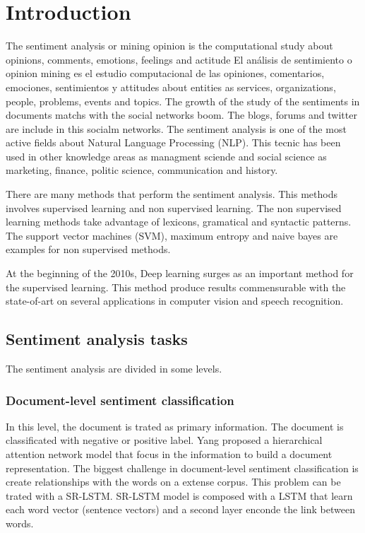 \section{Introduction}

The sentiment analysis or mining opinion is the computational study about opinions, comments, emotions, feelings and actitude
El análisis de sentimiento o opinion mining es el estudio computacional de las opiniones, comentarios, emociones, sentimientos y attitudes about entities as services, organizations, people, problems, events and topics\cite{Liu_2015}. The growth of the study of the sentiments in documents matchs with the social networks boom. The blogs, forums and twitter are include in this socialm networks. The sentiment analysis is one of the most active fields about Natural Language Processing (NLP). This tecnic has been used in other knowledge areas as managment sciende and social science as marketing, finance, politic science, communication and history\cite{Chalothom_2015}.

There are many methods that perform the sentiment analysis. This methods involves supervised learning and non supervised learning. The non supervised learning methods take advantage of lexicons, gramatical and syntactic patterns. The support vector machines (SVM), maximum entropy and naive bayes are examples for non supervised methods\cite{Liu_2012,Liu_2015,Lee_2009}.

At the beginning of the 2010s, Deep learning surges as an important method for the supervised learning\cite{Goodfellow_2016}. This method produce results commensurable with the state-of-art on several applications in computer vision and speech recognition.

\subsection{Sentiment analysis tasks}

The sentiment analysis are divided in some levels\cite{Thomas_2013}.

\subsubsection{Document-level sentiment classification}

In this level, the document is trated as primary information. The document is classificated with negative or positive label. Yang\cite{Yang_2016} proposed a hierarchical attention network model that focus in the information to build a document representation. The biggest challenge in document-level sentiment classification is create relationships with the words on a extense corpus. This problem can be trated with a SR-LSTM\cite{Guozheng_2018}. SR-LSTM model is composed with a LSTM that learn each word vector (sentence vectors) and a second layer enconde the link between words.

